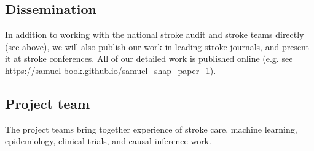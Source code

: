 \subsection{Dissemination}

In addition to working with the national stroke audit and stroke teams directly (see above), we will also publish our work in leading stroke journals, and present it at stroke conferences. All of our detailed work is published online (e.g. see \url{https://samuel-book.github.io/samuel_shap_paper_1}).

\subsection{Project team}

The project teams bring together experience of stroke care, machine learning, epidemiology, clinical trials, and causal inference work.

